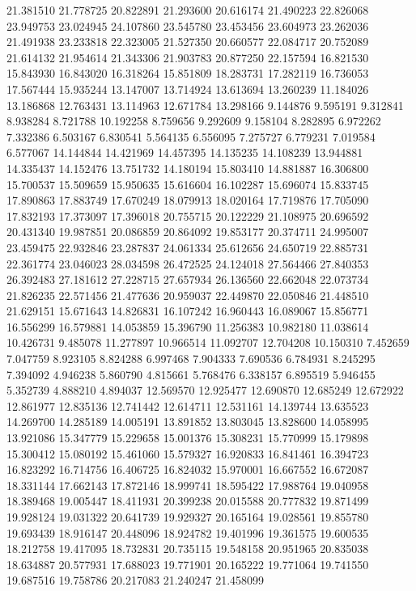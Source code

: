 21.381510
21.778725
20.822891
21.293600
20.616174
21.490223
22.826068
23.949753
23.024945
24.107860
23.545780
23.453456
23.604973
23.262036
21.491938
23.233818
22.323005
21.527350
20.660577
22.084717
20.752089
21.614132
21.954614
21.343306
21.903783
20.877250
22.157594
16.821530
15.843930
16.843020
16.318264
15.851809
18.283731
17.282119
16.736053
17.567444
15.935244
13.147007
13.714924
13.613694
13.260239
11.184026
13.186868
12.763431
13.114963
12.671784
13.298166
9.144876
9.595191
9.312841
8.938284
8.721788
10.192258
8.759656
9.292609
9.158104
8.282895
6.972262
7.332386
6.503167
6.830541
5.564135
6.556095
7.275727
6.779231
7.019584
6.577067
14.144844
14.421969
14.457395
14.135235
14.108239
13.944881
14.335437
14.152476
13.751732
14.180194
15.803410
14.881887
16.306800
15.700537
15.509659
15.950635
15.616604
16.102287
15.696074
15.833745
17.890863
17.883749
17.670249
18.079913
18.020164
17.719876
17.705090
17.832193
17.373097
17.396018
20.755715
20.122229
21.108975
20.696592
20.431340
19.987851
20.086859
20.864092
19.853177
20.374711
24.995007
23.459475
22.932846
23.287837
24.061334
25.612656
24.650719
22.885731
22.361774
23.046023
28.034598
26.472525
24.124018
27.564466
27.840353
26.392483
27.181612
27.228715
27.657934
26.136560
22.662048
22.073734
21.826235
22.571456
21.477636
20.959037
22.449870
22.050846
21.448510
21.629151
15.671643
14.826831
16.107242
16.960443
16.089067
15.856771
16.556299
16.579881
14.053859
15.396790
11.256383
10.982180
11.038614
10.426731
9.485078
11.277897
10.966514
11.092707
12.704208
10.150310
7.452659
7.047759
8.923105
8.824288
6.997468
7.904333
7.690536
6.784931
8.245295
7.394092
4.946238
5.860790
4.815661
5.768476
6.338157
6.895519
5.946455
5.352739
4.888210
4.894037
12.569570
12.925477
12.690870
12.685249
12.672922
12.861977
12.835136
12.741442
12.614711
12.531161
14.139744
13.635523
14.269700
14.285189
14.005191
13.891852
13.803045
13.828600
14.058995
13.921086
15.347779
15.229658
15.001376
15.308231
15.770999
15.179898
15.300412
15.080192
15.461060
15.579327
16.920833
16.841461
16.394723
16.823292
16.714756
16.406725
16.824032
15.970001
16.667552
16.672087
18.331144
17.662143
17.872146
18.999741
18.595422
17.988764
19.040958
18.389468
19.005447
18.411931
20.399238
20.015588
20.777832
19.871499
19.928124
19.031322
20.641739
19.929327
20.165164
19.028561
19.855780
19.693439
18.916147
20.448096
18.924782
19.401996
19.361575
19.600535
18.212758
19.417095
18.732831
20.735115
19.548158
20.951965
20.835038
18.634887
20.577931
17.688023
19.771901
20.165222
19.771064
19.741550
19.687516
19.758786
20.217083
21.240247
21.458099

